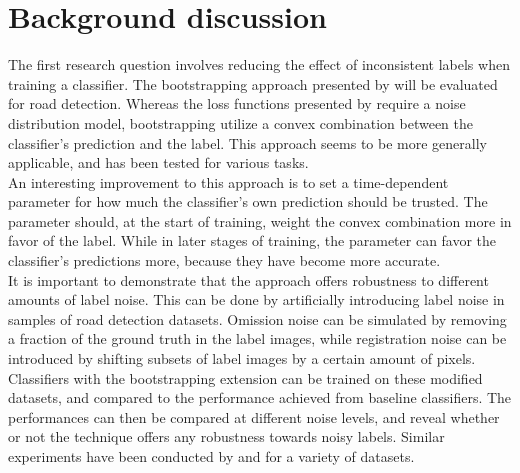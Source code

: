 \section{Background discussion}
\label{sec:backgroundDiscussion}
 The first research question involves reducing the effect of inconsistent labels when training a classifier. The bootstrapping approach presented by \cite{Reed_noisy_labels_bootstrapping} will be evaluated for road detection. Whereas the loss functions presented by \citep{Mnih_aerial_images_noisy} require a noise distribution model,  bootstrapping utilize a   convex combination between the classifier's prediction and the label. This approach seems to be more generally applicable, and has been tested for various tasks.\\

 An interesting improvement to this approach is to set a time-dependent parameter for how much the classifier's own prediction should be trusted. The parameter should, at the start of training, weight the convex combination more in favor of the label. While in later stages of training, the parameter can favor the classifier's predictions more, because they have become more accurate.\\

It is important to demonstrate that the approach offers robustness to different amounts of label noise. This can be done by artificially introducing label noise in samples of road detection datasets. Omission noise can be simulated by removing a fraction of the ground truth in the label images, while registration noise can be introduced by shifting subsets of label images by a certain amount of pixels. Classifiers with the bootstrapping extension can be trained on these modified datasets, and compared to the performance achieved from baseline classifiers. The performances can then be compared at different noise levels, and reveal whether or not the technique offers any robustness towards noisy labels. Similar experiments have been conducted by \citep{Sukhbaatar_noisy_network_learning} and \citep{Reed_noisy_labels_bootstrapping} for a variety of datasets. \\

